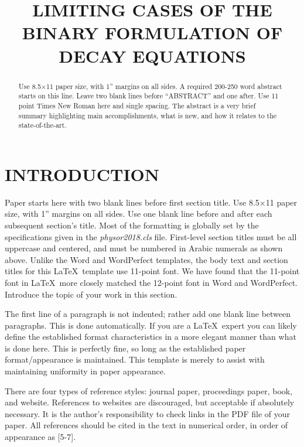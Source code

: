 \documentclass[letterpaper]{physor2018}
\title{LIMITING CASES OF THE BINARY FORMULATION OF DECAY EQUATIONS}
\author{%
  \textbf{Anthony M. Scopatz$^1$} \\
  $^1$University of South Carolina \\
  541 Main Street #011, \\
  Columbia, SC 29208 \\
\\
  \url{scopatz@cec.sc.edu}
}
\begin{document}
\maketitle
\justify

\begin{abstract}
  Use 8.5$\times$11 paper size, with 1'' margins on all sides.  A required 200-250
  word abstract starts on this line.  Leave two blank lines before ``ABSTRACT''
  and one after.  Use 11 point Times New Roman here and single
  spacing. The abstract is a very brief summary highlighting main
  accomplishments, what is new, and how it relates to the state-of-the-art.
\end{abstract}

\section{INTRODUCTION}
Paper starts here with two blank lines before first section title.  Use
8.5$\times$11 paper size, with 1'' margins on all sides.  Use one blank line
before and after each subsequent section’s title.  Most of the formatting is globally
set by the specifications given in the \emph{physor2018.cls} file.
First-level section titles must be all uppercase and centered, and must
be numbered in Arabic numerals as shown above.  Unlike the Word and WordPerfect
templates, the body text and section titles for this \LaTeX\ template use
11-point font.  We have found that the 11-point font in \LaTeX\ more closely
matched the 12-point font in Word and WordPerfect.  Introduce the topic of your work
in this section.

The first line of a paragraph is not indented; rather add one blank line between
paragraphs.  This is done automatically. If you are a \LaTeX\ expert you
can likely define the established format characteristics in a more elegant
manner than what is done here.  This is perfectly fine, so long as the
established paper format/appearance is maintained.  This template is merely
to assist with maintaining uniformity in paper appearance.

There are four types of reference styles: journal paper\cite{journal},
proceedings paper\cite{proc_paper}, book\cite{book}, and website\cite{website}.
References to websites are discouraged, but acceptable if absolutely necessary. It
is the author’s responsibility to check links in the PDF file of your paper.
All references should be cited in the text in numerical order, in order of
appearance as [5-7].
\end{document}
